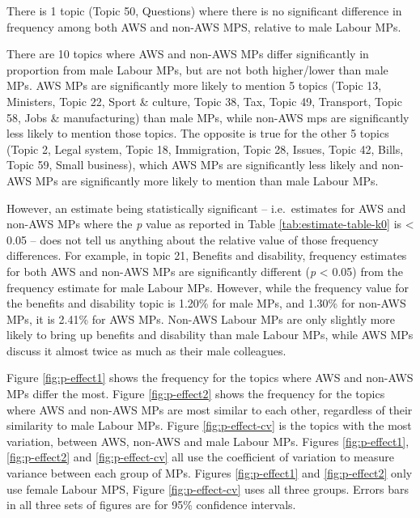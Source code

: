 \documentclass[]{article}
\theoremstyle{definition}
\theoremstyle{definition}
\theoremstyle{definition}
\theoremstyle{remark}
\begin{document}
There is 1 topic (Topic 50, Questions) where there is no significant
difference in frequency among both AWS and non-AWS MPS, relative to male
Labour MPs.

There are 10 topics where AWS and non-AWS MPs differ significantly in
proportion from male Labour MPs, but are not both higher/lower than male
MPs. AWS MPs are significantly more likely to mention 5 topics (Topic
13, Ministers, Topic 22, Sport \& culture, Topic 38, Tax, Topic 49,
Transport, Topic 58, Jobs \& manufacturing) than male MPs, while non-AWS
mps are significantly less likely to mention those topics. The opposite
is true for the other 5 topics (Topic 2, Legal system, Topic 18,
Immigration, Topic 28, Issues, Topic 42, Bills, Topic 59, Small
business), which AWS MPs are significantly less likely and non-AWS MPs
are significantly more likely to mention than male Labour MPs.

However, an estimate being statistically significant -- i.e.~estimates
for AWS and non-AWS MPs where the \emph{p} value as reported in Table
\ref{tab:estimate-table-k0} is \textless{} 0.05 -- does not tell us
anything about the relative value of those frequency differences. For
example, in topic 21, Benefits and disability, frequency estimates for
both AWS and non-AWS MPs are significantly different (\emph{p}
\textless{} 0.05) from the frequency estimate for male Labour MPs.
However, while the frequency value for the benefits and disability topic
is 1.20\% for male MPs, and 1.30\% for non-AWS MPs, it is 2.41\% for AWS
MPs. Non-AWS Labour MPs are only slightly more likely to bring up
benefits and disability than male Labour MPs, while AWS MPs discuss it
almost twice as much as their male colleagues.

Figure \ref{fig:p-effect1} shows the frequency for the topics where AWS
and non-AWS MPs differ the most. Figure \ref{fig:p-effect2} shows the
frequency for the topics where AWS and non-AWS MPs are most similar to
each other, regardless of their similarity to male Labour MPs. Figure
\ref{fig:p-effect-cv} is the topics with the most variation, between
AWS, non-AWS and male Labour MPs. Figures \ref{fig:p-effect1},
\ref{fig:p-effect2} and \ref{fig:p-effect-cv} all use the coefficient of
variation to measure variance between each group of MPs. Figures
\ref{fig:p-effect1} and \ref{fig:p-effect2} only use female Labour MPS,
Figure \ref{fig:p-effect-cv} uses all three groups. Errors bars in all
three sets of figures are for 95\% confidence intervals.
\end{document}
